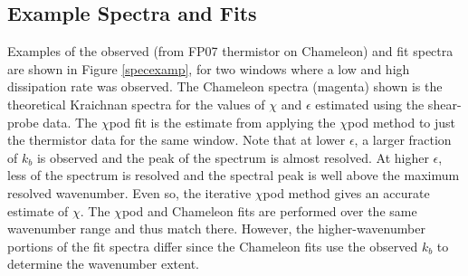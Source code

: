 \documentclass{ametsoc}
\begin{document}
\subsection{Example Spectra and Fits}

Examples of the observed (from FP07 thermistor on Chameleon) and fit spectra are shown in Figure \ref{specexamp}, for two windows where a low and high dissipation rate was observed. The Chameleon spectra (magenta) shown is the theoretical Kraichnan spectra for the values of $\chi$ and $\epsilon$ estimated using the shear-probe data. The $\chi$pod fit is the estimate from applying the $\chi$pod method to just the thermistor data for the same window. Note that at lower $\epsilon$, a larger fraction of $k_b$ is observed and the peak of the spectrum is almost resolved. At higher $\epsilon$, less of the spectrum is resolved and the spectral peak is well above the maximum resolved wavenumber. Even so, the iterative $\chi$pod method gives an accurate estimate of $\chi$. The $\chi$pod and Chameleon fits are performed over the same wavenumber range and thus match there. However, the higher-wavenumber portions of the fit spectra differ since the Chameleon fits use the observed $k_b$ to determine the wavenumber extent.



\end{document}
